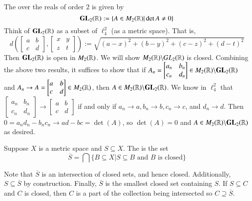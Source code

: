 \begin{example}
    The  over the reals of order $2$ is given by $$\mathbf{GL}_2(\mathbb R) := \{A \in M_2(\mathbb R)\vert \det A \neq 0\}$$ Think of $\mathbf{GL}_2(\mathbb R)$ as a subset of $\ell_4^2$ (as a metric space). That is, $$d\left(\begin{bmatrix} a & b \\ c & d\end{bmatrix},\begin{bmatrix} x & y \\ z & t\end{bmatrix}\right) := \sqrt{(a-x)^2+(b-y)^2 + (c-z)^2 + (d-t)^2}$$ Then $\mathbf{GL}_2(\mathbb R)$ is open in $M_2(\mathbb R)$. We will show $M_2(\mathbb R)\backslash GL_2(\mathbb R)$ is closed. Combining the above two results, it suffices to show that if $A_n = \begin{bmatrix} a_n & b_n \\ c_n & d_n\end{bmatrix} \in M_2(\mathbb R) \backslash\mathbf{GL}_2(\mathbb R)$ and $A_n \rightarrow A = \begin{bmatrix} a & b \\ c & d\end{bmatrix} \in M_2(\mathbb R)$, then $A \in M_2(\mathbb R)\backslash\mathbf{GL}_2(\mathbb R)$. We know in $\ell_4^2$ that $\begin{bmatrix} a_n & b_n \\ c_n & d_n\end{bmatrix}\rightarrow \begin{bmatrix} a & b \\ c & d\end{bmatrix}$ if and only if $a_n\rightarrow a,b_n\rightarrow b, c_n\rightarrow c$, and $d_n\rightarrow d$. Then $0 = a_nd_n - b_nc_n\rightarrow ad-bc = \det(A)$, so $\det(A) = 0$ and $A \in M_2(\mathbb R)\backslash\mathbf{GL}_2(\mathbb R)$ as desired.
\end{example}

\begin{definition}[Closures]
    Suppose $X$ is a metric space and $S \subseteq X$. The  is the set $$\overline{S} = \bigcap\{B\subseteq X\vert S\subseteq B\text{ and $B$ is closed}\}$$
\end{definition}

Note that $\overline{S}$ is an intersection of closed sets, and hence closed. Additionally, $S \subseteq \overline{S}$ by construction. Finally, $\overline{S}$ is the smallest closed set containing $S$. If $S \subseteq C$ and $C$ is closed, then $C$ is a part of the collection being intersected so $C \supseteq \overline{S}$.

